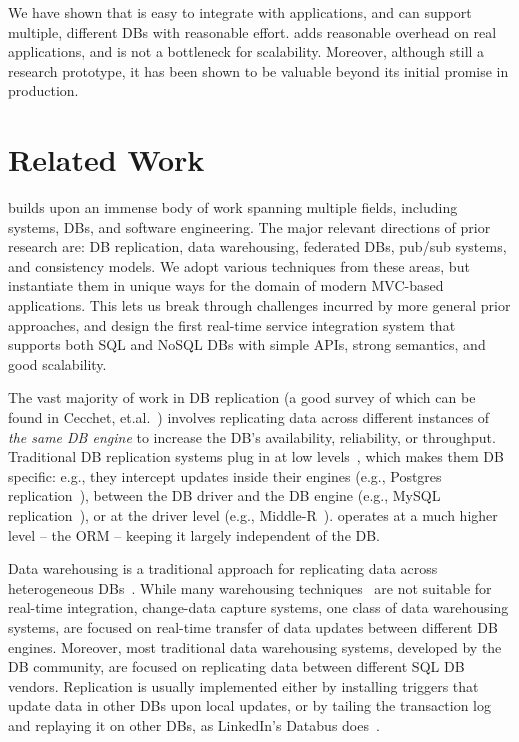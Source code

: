 We have shown that \synapse is easy to integrate with applications,
and can support multiple, different DBs with reasonable effort. \synapse adds
reasonable overhead on real applications, and is not a bottleneck for
scalability.  Moreover, although still a research prototype, it has been shown
to be valuable beyond its initial promise in production.

\section{Related Work}
\label{synapse:sec:related}

\synapse builds upon an immense body of work spanning multiple fields,
including systems, DBs, and software engineering. The major relevant
directions of prior research are: DB replication, data warehousing, federated
DBs, pub/sub systems, and consistency models. We adopt various techniques from
these areas, but instantiate them in unique ways for the domain of modern
MVC-based applications. This lets us break through challenges incurred by more
general prior approaches, and design the first real-time service integration
system that supports both SQL and NoSQL DBs with simple APIs, strong semantics,
and good scalability.

The vast majority of work in DB replication (a good survey of which can be found
in Cecchet, et.al.~\cite{candea-db-replication}) involves replicating data
across different instances of {\em the same DB engine} to increase the DB's
availability, reliability, or throughput.  Traditional DB replication systems
plug in at low levels~\cite{candea-db-replication}, which makes them DB
specific: e.g., they intercept updates inside their engines (e.g., Postgres
replication~\cite{postgres-r}), between the DB driver and the DB engine (e.g.,
MySQL replication~\cite{mysql-replication}), or at the driver level (e.g.,
Middle-R~\cite{middle-r}).  \synapse operates at a much higher level -- the
ORM -- keeping it largely independent of the DB.

Data warehousing is a traditional approach for replicating data across
heterogeneous DBs~\cite{books/daglib/0029346,Chaudhuri:1997:ODW:248603.248616}.
While many warehousing techniques~\cite{Chan:1999:DSM:319757.319787,10.1109/TKDE.2005.16,Yang:1997:AMV:645923.673657,dynamo-es-river,mongo-es-river,mosql} are not suitable for
real-time integration, change-data capture systems, one class of data
warehousing systems, are focused on real-time transfer of data updates
between different DB engines. 
Moreover, most traditional data warehousing systems, developed by the DB
community, are focused on replicating data between different SQL DB vendors.
Replication is usually implemented either by installing
triggers that update data in other DBs upon local updates, or by tailing the
transaction log and replaying it on other DBs, as LinkedIn's Databus
does~\cite{databus}.

